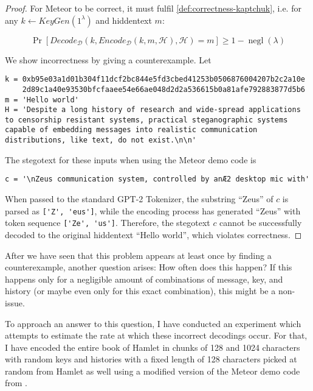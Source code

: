 \begin{proof}
For Meteor to be correct, it must fulfil \autoref{def:correctness-kaptchuk}, i.e. for any $k \leftarrow KeyGen(1^\lambda)$ and hiddentext $m$:

$$\mathop{Pr}[Decode_{\mathcal{D}}(k, Encode_{\mathcal{D}}(k, m, \mathcal{H}), \mathcal{H}) = m] \geq 1 - \mathop{negl}(\lambda)$$

We show incorrectness by giving a counterexample. 
Let

\begin{lstlisting}[breaklines]
k = 0xb95e03a1d01b304f11dcf2bc844e5fd3cbed41253b0506876004207b2c2a10e
    2d89c1a40e93530bfcfaaee54e66ae048d2d2a536615b0a81afe792883877d5b6
m = 'Hello world'
H = 'Despite a long history of research and wide-spread applications to censorship resistant systems, practical steganographic systems capable of embedding messages into realistic communication distributions, like text, do not exist.\n\n'
\end{lstlisting}

The stegotext for these inputs when using the Meteor demo code is

\begin{lstlisting}
c = '\nZeus communication system, controlled by anÆ2 desktop mic with'
\end{lstlisting}

When passed to the standard GPT-2 Tokenizer, the substring ``Zeus'' of $c$ is parsed as \lstinline{['Z', 'eus']}, while the encoding process has generated ``Zeus'' with token sequence \lstinline{['Ze', 'us']}.
Therefore, the stegotext $c$ cannot be successfully decoded to the original hiddentext ``Hello world'', which violates correctness.
\end{proof}

After we have seen that this problem appears at least once by finding a counterexample, another question arises:
How often does this happen?
If this happens only for a negligible amount of combinations of message, key, and history (or maybe even only for this exact combination), this might be a non-issue.

To approach an answer to this question, I have conducted an experiment which attempts to estimate the rate at which these incorrect decodings occur.
For that, I have encoded the entire book of Hamlet in chunks of 128 and 1024 characters with random keys and histories with a fixed length of 128 characters picked at random from Hamlet as well using a modified version of the Meteor demo code from \cite{MeteorDemo2021}.

